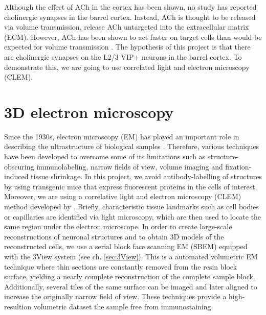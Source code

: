 Although the effect of ACh in the cortex has been shown, no study has reported cholinergic synapses in the barrel cortex. Instead, ACh is thought to be released via volume transmission, release ACh untargeted into the extracellular matrix (ECM). However, ACh has been shown to act faster on target cells than would be expected for volume transmission \citep{Fu2014}. The hypothesis of this project is that there are cholinergic synapses on the L2/3 VIP+ neurons in the barrel cortex. To demonstrate this, we are going to use correlated light and electron microscopy (CLEM).
\section{3D electron microscopy}
\label{sec:EM microscopy}
Since the 1930s, electron microscopy (EM) has played an important role in describing the ultrastructure of biological samples \citep{Knott2013}. Therefore, various techniques have been developed to overcome some of its limitations such as structure-obscuring immunolabeling, narrow fields of view, volume imaging and fixation-induced tissue shrinkage. In this project, we avoid antibody-labelling of structures by using transgenic mice that express fluorescent proteins in the cells of interest. Moreover, we are using a correlative light and electron microscopy (CLEM) method developed by \cite{Maclachlan2018a}. Briefly, characteristic tissue landmarks such as cell bodies or capillaries are identified via light microscopy, which are then used to locate the same region under the electron microscope. In order to create large-scale reconstructions of neuronal structures and to obtain 3D models of the reconstructed cells, we use a serial block face scanning EM (SBEM) equipped with the 3View system (see ch. \ref{sec:3View}). This is a automated volumetric EM technique where thin sections are constantly removed from the resin block surface, yielding a nearly complete reconstruction of the complete sample block. Additionally, several tiles of the same surface can be imaged and later aligned to increase the originally narrow field of view. These techniques provide a high-resultion volumetric dataset the sample free from immunostaining.
